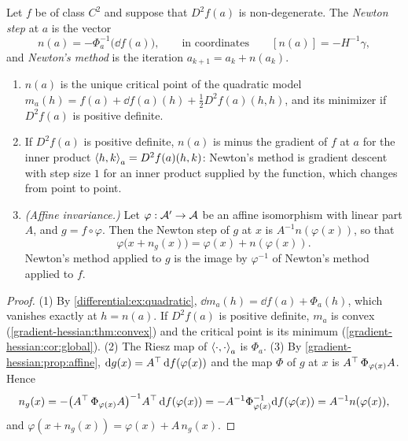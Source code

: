 \begin{notechapter}
\begin{definition}\label{gradient-hessian:def:newton}
Let $f$ be of class $C^2$ and suppose that $D^2f(a)$ is non-degenerate.
The \emph{Newton step} at $a$ is the vector
\[
  n(a) = -\Phi_a^{-1}\bigl(\dd f(a)\bigr) ,
  \qquad\text{in coordinates}\qquad [n(a)] = -H^{-1}\gamma ,
\]
and \emph{Newton's method} is the iteration $a_{k+1} = a_k + n(a_k)$.
\end{definition}

\begin{proposition}
\label{gradient-hessian:prop:newton}
\begin{enumerate}[nosep]
  \item $n(a)$ is the unique critical point of the quadratic model
        $m_a(h) = f(a) + \dd f(a)(h) + \frac12D^2f(a)(h, h)$, and its
        minimizer if $D^2f(a)$ is positive definite.
  \item If $D^2f(a)$ is positive definite, $n(a)$ is minus the gradient of
        $f$ at $a$ for the inner product $\left\langle h, k \right\rangle_a = D^2f(a)(h, k)$:
        Newton's method is gradient descent with step size $1$ for an
        inner product supplied by the function, which changes from point
        to point.
  \item \emph{(Affine invariance.)} Let $\varphi:\mathcal{A}'\to\mathcal{A}$ be an
        affine isomorphism with linear part $A$, and $g = f\circ\varphi$.
        Then the Newton step of $g$ at $x$ is
        $A^{-1}n(\varphi(x))$, so that
        \[
          \varphi\bigl(x + n_g(x)\bigr) = \varphi(x) + n(\varphi(x)) .
        \]
        Newton's method applied to $g$ is the image by $\varphi^{-1}$ of
        Newton's method applied to $f$.
\end{enumerate}
\end{proposition}

\begin{proof}
(1) By \cref{differential:ex:quadratic},
$\dd m_a(h) = \dd f(a) + \Phi_a(h)$, which vanishes exactly at
$h = n(a)$. If $D^2f(a)$ is positive definite, $m_a$ is convex
(\cref{gradient-hessian:thm:convex}) and the critical point is its
minimum (\cref{gradient-hessian:cor:global}). (2) The Riesz map of
$\left\langle \cdot, \cdot \right\rangle_a$ is $\Phi_a$. (3) By
\cref{gradient-hessian:prop:affine},
$\mathrm{d} g(x) = A^{\top}\,\mathrm{d} f(\varphi(x))$ and the map $\Phi$ of $g$ at $x$
is $A^{\top}\,\Phi_{\varphi(x)}A$. Hence
\[
  n_g(x) = -\bigl(A^{\top}\,\Phi_{\varphi(x)}A\bigr)^{-1}
  A^{\top}\,\mathrm{d} f(\varphi(x))
  = -A^{-1}\Phi_{\varphi(x)}^{-1}\mathrm{d} f(\varphi(x))
  = A^{-1}n(\varphi(x)) ,
\]
and $\varphi(x + n_g(x)) = \varphi(x) + A\,n_g(x)$.
\end{proof}


\end{notechapter}
